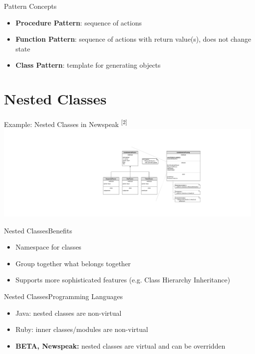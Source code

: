 \documentclass[xcolor=dvipsname,handout]{beamer} %
\begin{document}
\begin{frame}{Pattern Concepts}
  \begin{itemize}
    \item \textbf{Procedure Pattern}: sequence of actions
    \item \textbf{Function Pattern}: sequence of actions with return value(s), does not change state
    \item \textbf{Class Pattern}: template for generating objects
  \end{itemize}
\end{frame}

\section{Nested Classes}
\begin{frame}{Example: Nested Classes in Newspeak \textsuperscript{[2]}}
\includegraphics[width=\textwidth]{resources/newspeak_basic}
\end{frame}

\begin{frame}{Nested Classes}{Benefits}
\begin{itemize}
  \item Namespace for classes
  \item Group together what belongs together
  \item Supports more sophisticated features (e.g. Class Hierarchy Inheritance)
\end{itemize}
\end{frame}

\begin{frame}{Nested Classes}{Programming Languages}
\begin{itemize}
  \item Java: nested classes are non-virtual
  \item Ruby: inner classes/modules are non-virtual
  \item \textbf{BETA, Newspeak:} nested classes are virtual and can be overridden
\end{itemize}
\end{frame}
\end{document}
